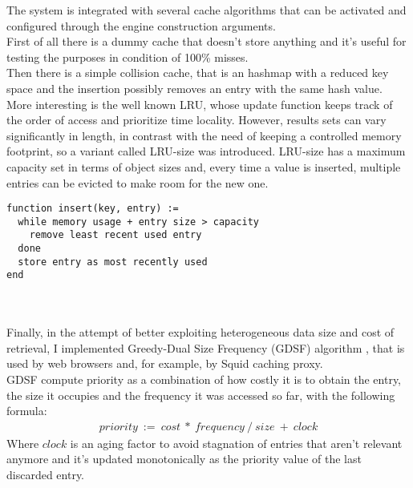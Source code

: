 The system is integrated with several cache algorithms that can be activated and configured through the engine construction arguments.\\
First of all there is a dummy cache that doesn't store anything and it's useful for testing the purposes in condition of 100\% misses.\\
Then there is a simple collision cache, that is an hashmap with a reduced key space and the insertion possibly removes an entry with the same hash value.\\
More interesting is the well known LRU, whose update function keeps track of the order of access and prioritize time locality. However, results sets can vary significantly in length, in contrast with the need of keeping a controlled memory footprint, so a variant called LRU-size was introduced. LRU-size has a maximum capacity set in terms of object sizes and, every time a value is inserted, multiple entries can be evicted to make room for the new one.\\
\begin{minipage}{\textwidth}
\begin{lstlisting}[caption={LRU-size insertion},label={lst:lrusize},xleftmargin=.15\textwidth]
function insert(key, entry) :=
  while memory usage + entry size > capacity
    remove least recent used entry
  done
  store entry as most recently used
end
\end{lstlisting}
\end{minipage}\\
\\
Finally, in the attempt of better exploiting heterogeneous data size and cost of retrieval, I implemented Greedy-Dual Size Frequency (GDSF) algorithm \cite{gdsf}, that is used by web browsers and, for example, by Squid caching proxy.\\
GDSF compute priority as a combination of how costly it is to obtain the entry, the size it occupies and the frequency it was accessed so far, with the following formula:
\begin{align*}
priority\ :=\ cost\ *\ frequency\ /\ size\ +\ clock
\end{align*}
Where $clock$ is an aging factor to avoid stagnation of entries that aren't relevant anymore and it's updated monotonically as the priority value of the last discarded entry.
